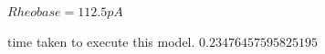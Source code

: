     

$ Rheobase = 112.5pA $

time taken to execute this model.
$ 0.23476457595825195 $

    







